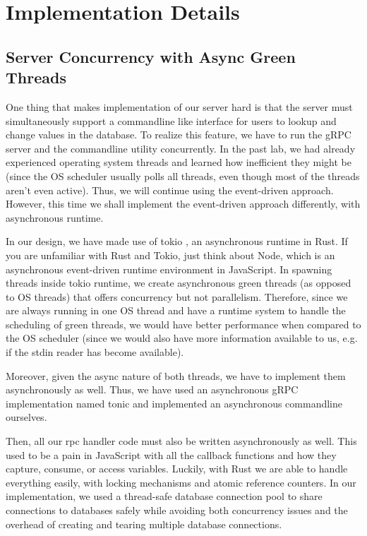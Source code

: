 \documentclass[letterpaper,11pt,twocolumn]{article}
\begin{document}
\section{Implementation Details}


\subsection{Server Concurrency with Async Green Threads}
One thing that makes implementation of our server hard is that the server must simultaneously support a commandline like interface for users to lookup and change values in the database.
To realize this feature, we have to run the gRPC server and the commandline utility concurrently.
In the past lab, we had already experienced operating system threads and learned how inefficient they might be (since the OS scheduler usually polls all threads, even though most of the threads aren't even active). Thus, we will continue using the event-driven approach. However, this time we shall implement the event-driven approach differently, with asynchronous runtime.

In our design, we have made use of tokio \cite{tokio}, an asynchronous runtime in Rust. If you are unfamiliar with Rust and Tokio, just think about Node, which is an asynchronous event-driven runtime environment in JavaScript.
In spawning threads inside tokio runtime, we create asynchronous green threads (as opposed to OS threads) that offers concurrency but not parallelism.
Therefore, since we are always running in one OS thread and have a runtime system to handle the scheduling of green threads, we would have better performance when compared to the OS scheduler (since we would also have more information available to us, e.g. if the stdin reader has become available). 

Moreover, given the async nature of both threads, we have to implement them asynchronously as well. Thus, we have used an asynchronous gRPC implementation named tonic \cite{tonic} and implemented an asynchronous commandline ourselves. 

Then, all our rpc handler code must also be written asynchronously as well. This used to be a pain in JavaScript with all the callback functions and how they capture, consume, or access variables. Luckily, with Rust we are able to handle everything easily, with locking mechanisms and atomic reference counters. In our implementation, we used a thread-safe database connection pool to share connections to databases safely while avoiding both concurrency issues and the overhead of creating and tearing multiple database connections. 
\end{document}
